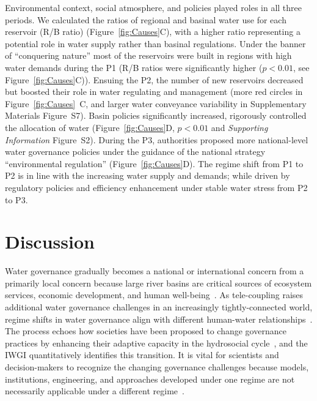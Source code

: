 \documentclass[draft]{../agujournal2019}
\begin{document}
Environmental context, social atmosphere, and policies played roles in all three periods.
We calculated the ratios of regional and basinal water use for each reservoir (R/B ratio) (Figure~\ref{fig:Causes}C), with a higher ratio representing a potential role in water supply rather than basinal regulations.
Under the banner of ``conquering nature'' most of the reservoirs were built in regions with high water demands during the P1 (R/B ratios were significantly higher ($p<0.01$, see Figure~\ref{fig:Causes}C)).
Ensuing the P2, the number of new reservoirs decreased but boosted their role in water regulating and management (more red circles in Figure~\ref{fig:Causes}~C, and larger water conveyance variability in Supplementary Materials Figure~S7).  Basin policies significantly increased, rigorously controlled the allocation of water (Figure~\ref{fig:Causes}D, $p<0.01$ and \textit{Supporting Information} Figure~S2).
During the P3, authorities proposed more national-level water governance policies under the guidance of the national strategy ``environmental regulation'' (Figure~\ref{fig:Causes}D).
The regime shift from P1 to P2 is in line with the increasing water supply and demands; while driven by regulatory policies and efficiency enhancement under stable water stress from P2 to P3.


\section{Discussion}\label{sec12}

Water governance gradually becomes a national or international concern from a primarily local concern because large river basins are critical sources of ecosystem services, economic development, and human well-being~\cite{best2019,best2020}.
As tele-coupling raises additional water governance challenges in an increasingly tightly-connected world, regime shifts in water governance align with different human-water relationships~\cite{diaz2019}.
The process echoes how societies have been proposed to change governance practices by enhancing their adaptive capacity in the hydrosocial cycle~\cite{loch2020,turton1999}, and the IWGI quantitatively identifies this transition.
It is vital for scientists and decision-makers to recognize the changing governance challenges because models, institutions, engineering, and approaches developed under one regime are not necessarily applicable under a different regime~\cite{reyers2018}.
\end{document}
